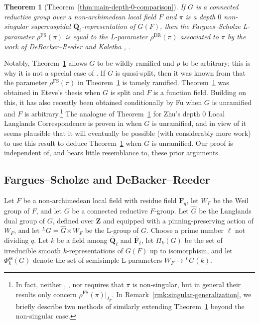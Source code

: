 \documentclass[reqno]{amsart}
\numberwithin{equation}{subsection}
\newcommand{\F}{\mathbf{F}}
\newcommand{\Q}{\mathbf{Q}}
\newcommand{\Z}{\mathbf{Z}}
\newcommand{\ol}[1]{\overline{#1}}
\newcommand{\wh}[1]{\widehat{#1}}
\newcommand{\ld}{{}^L}
\DeclareMathOperator{\FS}{FS}
\DeclareMathOperator{\DR}{DR}
\renewcommand{\ss}{\mathrm{ss}}
\newtheorem{thm}{Theorem}[subsection]
\theoremstyle{remark}
\numberwithin{equation}{subsection}
\numberwithin{figure}{subsection}
\begin{document}
\begin{thm}[Theorem~\ref{thm:main-depth-0-comparison}]\label{thm:intro-debacker-reeder}
    If $G$ is a connected reductive group over a non-archi\-medean local field $F$ and $\pi$ is a depth $0$ non-singular supercuspidal $\ol\Q_\ell$-representation of $G(F)$, then the Fargues--Scholze L-parameter $\rho^{\FS}(\pi)$ is equal to the L-parameter $\rho^{\DR}(\pi)$ associated to $\pi$ by the work of DeBacker--Reeder \cite{DR09} and Kaletha \cite{Kal19}, \cite{Kal21b}.
\end{thm}

Notably, Theorem~\ref{thm:intro-debacker-reeder} allows $G$ to be wildly ramified and $p$ to be arbitrary; this is why it is not a special case of \cite[Theorem 1.1.1]{CF26b}. If $G$ is quasi-split, then it was known from \cite[Corollary 1.1.1]{DL26} that the parameter $\rho^{\FS}(\pi)$ in Theorem~\ref{thm:intro-debacker-reeder} is tamely ramified. Theorem~\ref{thm:intro-debacker-reeder} was obtained in Eteve's thesis \cite[Theorem~2.3.9]{Ete23} when $G$ is split and $F$ is a function field. Building on this, it has also recently been obtained conditionally by Fu \cite{Fu26} when $G$ is unramified and $F$ is arbitrary.\footnote{In fact, neither \cite{DL26}, \cite{Ete23}, nor \cite{Fu26} requires that $\pi$ is non-singular, but in general their results only concern $\rho^{\FS}(\pi)|_{I_F}$. In Remark~\ref{rmk:singular-generalization}, we briefly describe two methods of similarly extending Theorem~\ref{thm:intro-debacker-reeder} beyond the non-singular case.} The analogue of Theorem~\ref{thm:intro-debacker-reeder} for Zhu's depth $0$ Local Langlands Correspondence is proven in \cite[\S 5.3.4]{Zhu25} when $G$ is unramified, and in view of \cite{GHILZ26} it seems plausible that it will eventually be possible (with considerably more work) to use this result to deduce Theorem~\ref{thm:intro-debacker-reeder} when $G$ is unramified. Our proof is independent of, and bears little resemblance to, these prior arguments.

\subsection{Fargues--Scholze and DeBacker--Reeder}

Let $F$ be a non-archimedean local field with residue field $\F_q$, let $W_F$ be the Weil group of $F$, and let $G$ be a connected reductive $F$-group. Let $\wh G$ be the Langlands dual group of $G$, defined over $\Z$ and equipped with a pinning-preserving action of $W_F$, and let $\ld G = \wh G \rtimes W_F$ be the L-group of $G$. Choose a prime number $\ell$ not dividing $q$. Let $k$ be a field among $\ol\Q_\ell$ and $\ol\F_\ell$, let $\Pi_k(G)$ be the set of irreducible smooth $k$-representations of $G(F)$ up to isomorphism, and let $\Phi_k^{\ss}(G)$ denote the set of semisimple L-parameters $W_F \to \ld G(k)$.
\end{document}
